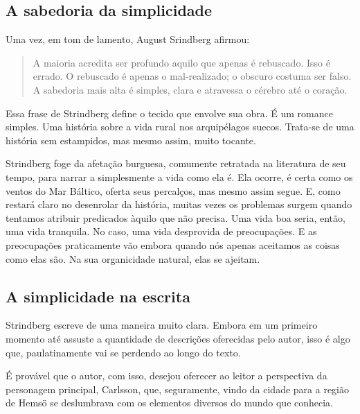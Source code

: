 \documentclass[12pt]{extarticle}
\begin{document}


\subsection{A sabedoria da simplicidade}

Uma vez, em tom de lamento, August Srindberg afirmou:

\begin{quote}
A maioria acredita ser profundo aquilo que apenas é rebuscado. Isso é
errado. O rebuscado é apenas o mal-realizado; o obscuro costuma ser
falso. A sabedoria mais alta é simples, clara e atravessa o cérebro até
o coração.
\end{quote}

Essa frase de Strindberg define o tecido que envolve sua obra. É um
romance simples. Uma história sobre a vida rural nos arquipélagos
suecos. Trata-se de uma história sem estampidos, mas mesmo assim, muito
tocante.




Strindberg foge da afetação burguesa, comumente retratada na literatura
de seu tempo, para narrar a simplesmente a vida como ela é. Ela ocorre,
é certa como os ventos do Mar Báltico, oferta seus percalços, mas mesmo
assim segue. E, como restará claro no desenrolar da história, muitas
vezes os problemas surgem quando tentamos atribuir predicados àquilo que
não precisa. Uma vida boa seria, então, uma vida tranquila. No caso, uma
vida desprovida de preocupações. E as preocupações praticamente vão
embora quando nós apenas aceitamos as coisas como elas são. Na sua
organicidade natural, elas se ajeitam.




\subsection{A simplicidade na escrita}

Strindberg escreve de uma maneira muito clara. Embora em um primeiro
momento até assuste a quantidade de descrições oferecidas pelo autor,
isso é algo que, paulatinamente vai se perdendo ao longo do texto.

É provável que o autor, com isso, desejou oferecer ao leitor a
perspectiva da personagem principal, Carlsson, que, seguramente, vindo
da cidade para a região de Hemsö se deslumbrava com os elementos
diversos do mundo que conhecia.
\end{document}
